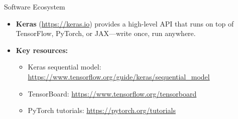 \documentclass[aspectratio=169,11pt]{beamer}
\begin{document}
\begin{frame}{Software Ecosystem}
\begin{center}
\end{center}

\vspace{0.5cm}
\begin{itemize}
    \item \textbf{Keras} (\url{https://keras.io}) provides a high-level API that runs on top of TensorFlow, PyTorch, or JAX---write once, run anywhere.
    \item \textbf{Key resources:}
    \begin{itemize}
        \item Keras sequential model: \url{https://www.tensorflow.org/guide/keras/sequential_model}
        \item TensorBoard: \url{https://www.tensorflow.org/tensorboard}
        \item PyTorch tutorials: \url{https://pytorch.org/tutorials}
    \end{itemize}
\end{itemize}
\end{frame}
\end{document}
